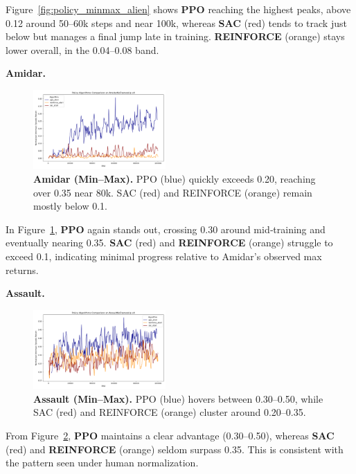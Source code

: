Figure~\ref{fig:policy_minmax_alien} shows \textbf{PPO} reaching the highest peaks, above 0.12 around 50--60k steps and near 100k, whereas \textbf{SAC} (red) tends to track just below but manages a final jump late in training. \textbf{REINFORCE} (orange) stays lower overall, in the 0.04--0.08 band.

\medskip

\textbf{Amidar.}
\begin{figure}[htbp]
	\centering
	\includegraphics[width=0.45\textwidth]{figures/policy_comparison/charts_episodic_return_minmax_comparison_AmidarNoFrameskip-v4_policy.png}
	\caption{\textbf{Amidar (Min--Max).} PPO (blue) quickly exceeds 0.20, reaching over 0.35 near 80k. SAC (red) and REINFORCE (orange) remain mostly below 0.1.}
	\label{fig:policy_minmax_amidar}
\end{figure}

In Figure~\ref{fig:policy_minmax_amidar}, \textbf{PPO} again stands out, crossing 0.30 around mid‐training and eventually nearing 0.35. \textbf{SAC} (red) and \textbf{REINFORCE} (orange) struggle to exceed 0.1, indicating minimal progress relative to Amidar’s observed max returns.

\medskip

\textbf{Assault.}
\begin{figure}[htbp]
	\centering
	\includegraphics[width=0.45\textwidth]{figures/policy_comparison/charts_episodic_return_minmax_comparison_AssaultNoFrameskip-v4_policy.png}
	\caption{\textbf{Assault (Min--Max).} PPO (blue) hovers between 0.30--0.50, while SAC (red) and REINFORCE (orange) cluster around 0.20--0.35.}
	\label{fig:policy_minmax_assault}
\end{figure}

From Figure~\ref{fig:policy_minmax_assault}, \textbf{PPO} maintains a clear advantage (0.30--0.50), whereas \textbf{SAC} (red) and \textbf{REINFORCE} (orange) seldom surpass 0.35. This is consistent with the pattern seen under human normalization.

